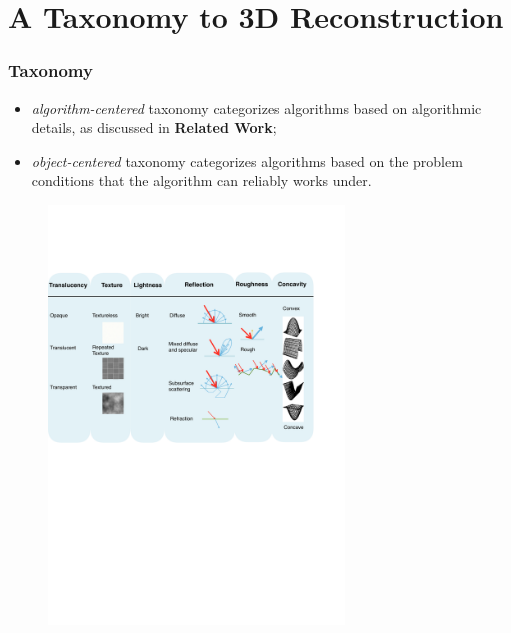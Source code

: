 \documentclass{beamer}
\begin{document}
\section{A Taxonomy to 3D Reconstruction} %


\begin{frame}
\frametitle{Taxonomy}
\begin{itemize}
\item \textit{algorithm-centered} taxonomy categorizes algorithms based on algorithmic details, as discussed in \textbf{Related Work};
\item \textit{object-centered} taxonomy categorizes algorithms based on the problem conditions that the algorithm can reliably works under.
\end{itemize}

\begin{figure}[h]
\includegraphics[width=0.7\textwidth]{taxo/obj_class}
\end{figure}

\end{frame}
\end{document}

